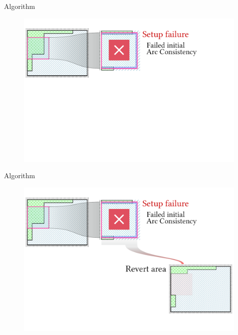 \documentclass{beamer}
\begin{document}
  \begin{frame}[fragile]{Algorithm}
    \begin{figure}
      \includegraphics[width=\textwidth]{figs/poms_alg6_1.pdf}
    \end{figure}
  \end{frame}

  \begin{frame}[fragile]{Algorithm}
    \begin{figure}
      \includegraphics[width=\textwidth]{figs/poms_alg6_2.pdf}
    \end{figure}
  \end{frame}
\end{document}
